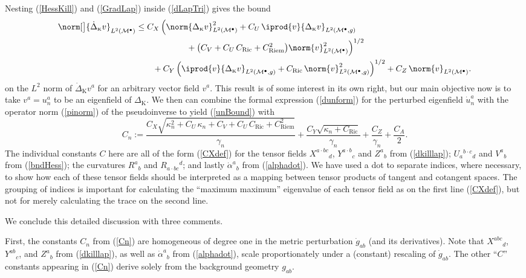 \documentclass[12pt,letterpaper]{iopart}
\newcommand\Lap[1][K]{\Delta_{\scriptscriptstyle\mathrm{#1}}}
\newcommand\dLap[1][K]{\dot\Delta_{\scriptscriptstyle\mathrm{#1}}}
\newcommand\M{\mathcal{M}}
\newcommand\ind{{\bullet}}
\DeclareMathOperator\Ric{Ric}
\DeclareMathOperator\Riem{Riem}
\begin{document}
Nesting (\ref{HessKill}) and (\ref{GradLap}) inside (\ref{dLapTri}) gives the bound
%
\begin{align}\label{dLapLap}
	\norm[\big]{\dLap v}_{L^2(\M^\ind)} &\le 
		C_X\, \Bigl( 
			\norm{\Lap v}^2_{L^2(\M^\ind)}
			+ C_U\, \iprod{v}{\Lap v}_{L^2(\M^\ind, g)} 
			\\&\hspace{6em}\notag
			+ \bigl( C_V + C_U\, C_{\Ric} + C_{\Riem}^2 \bigr) \norm{v}^2_{L^2(\M^\ind)} \Bigr)^{1/2}
			\\&\hspace{2em}\notag
		+ C_Y\, \Bigl(
			\iprod{v}{\Lap v}_{L^2(\M^\ind, g)} 
			+ C_{\Ric}\, \norm{v}^2_{L^2(\M^\ind, g)} \Bigr)^{1/2}
		+ C_Z\, \norm{v}_{L^2(\M^\ind)}.
\end{align}
%
on the $L^2$ norm of $\dLap v^a$ for an arbitrary vector field $v^a$.  This result is of some interest in its own right, but our main objective now is to take $v^a = u_n^a$ to be an eigenfield of $\Lap$.   We then can combine the formal expression (\ref{dunform}) for the perturbed eigenfield $\dot u_n^a$ with the operator norm (\ref{pinorm}) of the pseudoinverse to yield (\ref{unBound}) with  
%
\begin{equation}\label{Cn}
	C_n := \frac{C_X \sqrt{\kappa_n^2 + C_U\, \kappa_n + C_V + C_U\, C_{\Ric} + C_{\Riem}^2}}{\gamma_n}
		+ \frac{C_Y \sqrt{\kappa_n + C_{\Ric}}}{\gamma_n}
		+ \frac{C_Z}{\gamma_n}
		+ \frac{C_A}{2}.
\end{equation}
%
The individual constants $C$ here are all of the form (\ref{CXdef}) for the tensor fields $X^{a \cdot bc}{}_d$, $Y^{a \cdot b}{}_c$ and $Z^a{}_b$ from (\ref{dkilllap}); $U_a{}^{b \cdot c}{}_d$ and $V^a{}_b$ from (\ref{bndHess}); the curvatures $R^a{}_b$ and $R_{a \cdot bc}{}^d$; and lastly $\dot\alpha^a{}_b$ from (\ref{alphadot}).  We have used a dot to separate indices, where necessary, to show how each of these tensor fields should be interpreted as a mapping between tensor products of tangent and cotangent spaces.  The grouping of indices is important for calculating the ``maximum maximum'' eigenvalue of each tensor field as on the first line (\ref{CXdef}), but not for merely calculating the trace on the second line.

We conclude this detailed discussion with three comments.

First, the constants $C_n$ from (\ref{Cn}) are homogeneous of degree one in the metric perturbation $\dot g_{ab}$ (and its derivatives).  Note that $X^{abc}{}_d$, $Y^{ab}{}_c$, and $Z^a{}_b$ from (\ref{dkilllap}), as well as $\dot\alpha^a{}_b$ from (\ref{alphadot}), scale proportionately under a (constant) rescaling of $\dot g_{ab}$.  The other ``$C$'' constants appearing in (\ref{Cn}) derive solely from the background geometry $g_{ab}$.
\end{document}
